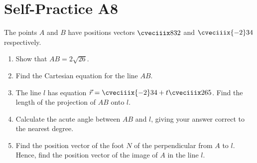 \section{Self-Practice A8}

\begin{problem}
    The points $A$ and $B$ have positions vectors $\cveciiix832$ and $\cveciiix{-2}34$ respectively.

    \begin{enumerate}
        \item Show that $AB = 2\sqrt{26}$.
        \item Find the Cartesian equation for the line $AB$.
        \item The line $l$ has equation $\vec r = \cveciiix{-2}34 + t\cveciiix265$. Find the length of the projection of $AB$ onto $l$.
        \item Calculate the acute angle between $AB$ and $l$, giving your answer correct to the nearest degree.
        \item Find the position vector of the foot $N$ of the perpendicular from $A$ to $l$. Hence, find the position vector of the image of $A$ in the line $l$.
    \end{enumerate}
\end{problem}
